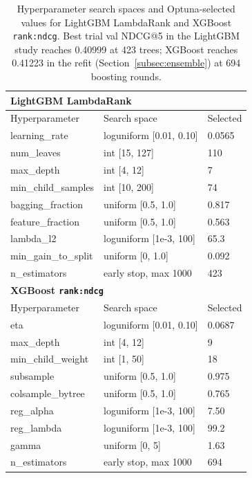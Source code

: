 \begin{table}[t]
\centering
\caption{Hyperparameter search spaces and Optuna-selected values for LightGBM LambdaRank and XGBoost \texttt{rank:ndcg}. Best trial val NDCG@5 in the LightGBM study reaches 0.40999 at 423 trees; XGBoost reaches 0.41223 in the refit (Section~\ref{subsec:ensemble}) at 694 boosting rounds.}
\label{tab:hyper}
\begin{tabular}{lll}
\toprule
\multicolumn{3}{l}{\textbf{LightGBM LambdaRank}} \\
\midrule
Hyperparameter & Search space & Selected \\
\midrule
learning\_rate & loguniform [0.01, 0.10] & 0.0565 \\
num\_leaves & int [15, 127] & 110 \\
max\_depth & int [4, 12] & 7 \\
min\_child\_samples & int [10, 200] & 74 \\
bagging\_fraction & uniform [0.5, 1.0] & 0.817 \\
feature\_fraction & uniform [0.5, 1.0] & 0.563 \\
lambda\_l2 & loguniform [1e-3, 100] & 65.3 \\
min\_gain\_to\_split & uniform [0, 1.0] & 0.092 \\
n\_estimators & early stop, max 1000 & 423 \\
\midrule
\multicolumn{3}{l}{\textbf{XGBoost \texttt{rank:ndcg}}} \\
\midrule
Hyperparameter & Search space & Selected \\
\midrule
eta & loguniform [0.01, 0.10] & 0.0687 \\
max\_depth & int [4, 12] & 9 \\
min\_child\_weight & int [1, 50] & 18 \\
subsample & uniform [0.5, 1.0] & 0.975 \\
colsample\_bytree & uniform [0.5, 1.0] & 0.765 \\
reg\_alpha & loguniform [1e-3, 100] & 7.50 \\
reg\_lambda & loguniform [1e-3, 100] & 99.2 \\
gamma & uniform [0, 5] & 1.63 \\
n\_estimators & early stop, max 1000 & 694 \\
\bottomrule
\end{tabular}
\end{table}

